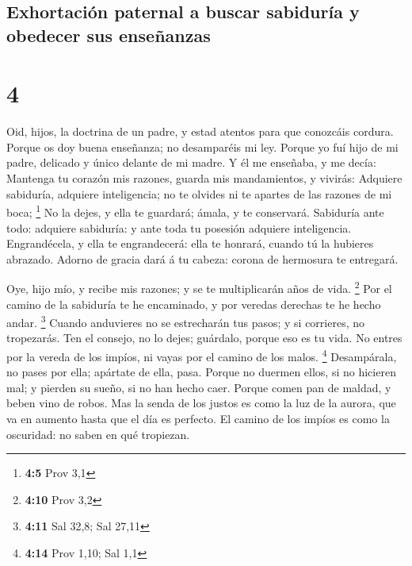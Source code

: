 \hypertarget{exhortaciuxf3n-paternal-a-buscar-sabiduruxeda-y-obedecer-sus-enseuxf1anzas}{%
\subsection{Exhortación paternal a buscar sabiduría y obedecer sus
enseñanzas}\label{exhortaciuxf3n-paternal-a-buscar-sabiduruxeda-y-obedecer-sus-enseuxf1anzas}}

\hypertarget{section-3}{%
\section{4}\label{section-3}}

 Oid, hijos, la doctrina de un padre, y estad atentos para
que conozcáis cordura.  Porque os doy buena enseñanza; no
desamparéis mi ley.  Porque yo fuí hijo de mi padre,
delicado y único delante de mi madre.  Y él me enseñaba, y
me decía: Mantenga tu corazón mis razones, guarda mis mandamientos, y
vivirás:  Adquiere sabiduría, adquiere inteligencia; no te
olvides ni te apartes de las razones de mi boca; \footnote{\textbf{4:5}
  Prov 3,1}  No la dejes, y ella te guardará; ámala, y te
conservará.  Sabiduría ante todo: adquiere sabiduría: y
ante toda tu posesión adquiere inteligencia. 
Engrandécela, y ella te engrandecerá: ella te honrará, cuando tú la
hubieres abrazado.  Adorno de gracia dará á tu cabeza:
corona de hermosura te entregará.

 Oye, hijo mío, y recibe mis razones; y se te
multiplicarán años de vida. \footnote{\textbf{4:10} Prov 3,2}
 Por el camino de la sabiduría te he encaminado, y por
veredas derechas te he hecho andar. \footnote{\textbf{4:11} Sal 32,8;
  Sal 27,11}  Cuando anduvieres no se estrecharán tus
pasos; y si corrieres, no tropezarás.  Ten el consejo, no
lo dejes; guárdalo, porque eso es tu vida.  No entres por
la vereda de los impíos, ni vayas por el camino de los malos.
\footnote{\textbf{4:14} Prov 1,10; Sal 1,1}  Desampárala,
no pases por ella; apártate de ella, pasa.  Porque no
duermen ellos, si no hicieren mal; y pierden su sueño, si no han hecho
caer.  Porque comen pan de maldad, y beben vino de robos.
 Mas la senda de los justos es como la luz de la aurora,
que va en aumento hasta que el día es perfecto.  El
camino de los impíos es como la oscuridad: no saben en qué tropiezan.

